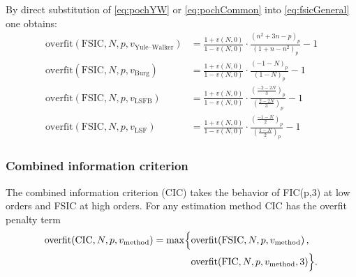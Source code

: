 \documentclass[12pt,letterpaper]{article}
\newcommand{\Pochhammer}[2]{\left(#1\right)_{#2}}
\begin{document}
By direct substitution of \eqref{eq:pochYW} or \eqref{eq:pochCommon} into
\eqref{eq:fsicGeneral} one obtains:
\begin{align}
    \text{overfit}\!\left(\text{FSIC},N,p,v_\text{Yule--Walker}\right)
    &=
    \frac{
        1 + v\!\left(N,0\right)
    }{
        1 - v\!\left(N,0\right)
    }
    \cdot
    \frac{
        \Pochhammer{n^2+3n-p}{p}
    }{
        \Pochhammer{1+n-n^2}{p}
    }
    - 1
    \\
    \text{overfit}\!\left(\text{FSIC},N,p,v_\text{Burg}\right)
    &=
    \frac{
        1 + v\!\left(N,0\right)
    }{
        1 - v\!\left(N,0\right)
    }
    \cdot
    \frac{
        \Pochhammer{-1-N}{p}
    }{
        \Pochhammer{1-N}{p}
    }
    - 1
    \\
    \text{overfit}\!\left(\text{FSIC},N,p,v_\text{LSFB}\right)
    &=
    \frac{
        1 + v\!\left(N,0\right)
    }{
        1 - v\!\left(N,0\right)
    }
    \cdot
    \frac{
        \Pochhammer{\frac{-2-2N}{3}}{p}
    }{
        \Pochhammer{\frac{2-2N}{3}}{p}
    }
    - 1
    \\
    \text{overfit}\!\left(\text{FSIC},N,p,v_\text{LSF}\right)
    &=
    \frac{
        1 + v\!\left(N,0\right)
    }{
        1 - v\!\left(N,0\right)
    }
    \cdot
    \frac{
        \Pochhammer{\frac{-1-N}{2}}{p}
    }{
        \Pochhammer{\frac{1-N}{2}}{p}
    }
    - 1
\end{align}

\subsubsection*{Combined information criterion}

The combined information criterion (CIC) takes the behavior of FIC(p,3) at low
orders and FSIC at high orders.  For any estimation method CIC has the
overfit penalty term
\begin{align}
    \text{overfit}\!\left(\text{CIC},N,p,v_\text{method}\right)
    =
    \max\Bigl\{
        &\text{overfit}\!\left(\text{FSIC},N,p,v_\text{method}\right),
\\
        &\text{overfit}\!\left(\text{FIC},N,p,v_\text{method},3\right)
    \Bigr\}
    .
\end{align}
\end{document}

